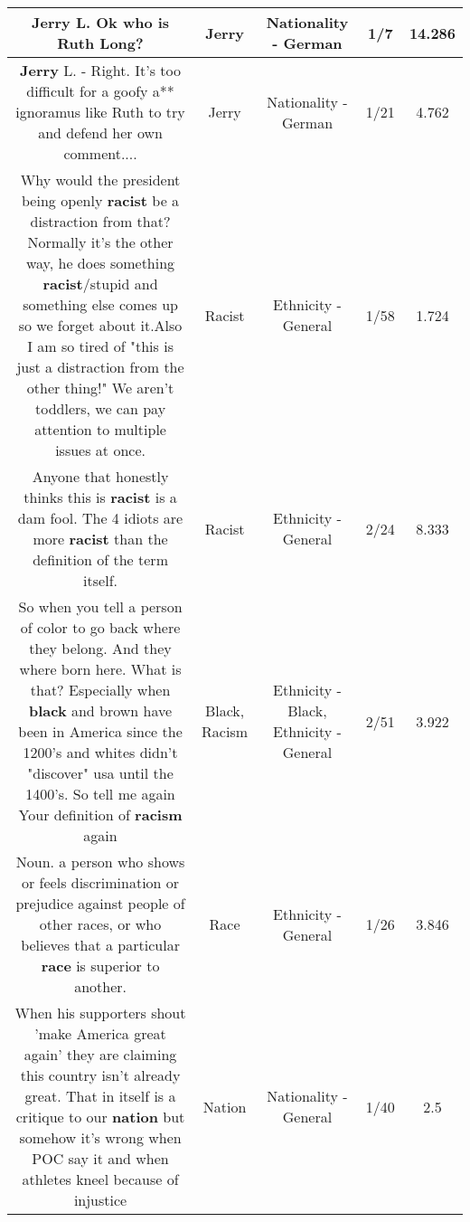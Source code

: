 \documentclass[11pt]{article}
\newlength\mylength
\begin{document}
\begin{center}
\begin{longtable}{|C{.65\mylength}|C{.30\mylength}|C{.12\mylength}|C{.12\mylength}|C{.12\mylength}|}
  \small \@\textbf{Jerry} L. Ok who is Ruth Long?\normalsize   & Jerry & Nationality - German & 1/7 & 14.286 \\  \hline
  \small \@\textbf{Jerry} L. - Right. It's too difficult for a goofy a** ignoramus like Ruth to try and defend her own comment....\normalsize   & Jerry & Nationality - German & 1/21 & 4.762 \\  \hline
  \small Why would the president being openly \textbf{racist} be a distraction from that? Normally it's the other way, he does something \textbf{racist}/stupid and something else comes up so we forget about it.Also I am so tired of "this is just a distraction from the other thing!" We aren't toddlers, we can pay attention to multiple issues at once.\normalsize   & Racist & Ethnicity - General & 1/58 & 1.724 \\  \hline
  \small Anyone that honestly thinks this is \textbf{racist} is a dam fool. The 4 idiots are more \textbf{racist} than the definition of the term itself.\normalsize   & Racist & Ethnicity - General & 2/24 & 8.333 \\  \hline
  \small So when you tell a person of color to go back where they belong. And they where born here. What is that? Especially when \textbf{black} and brown have been in America since the 1200's and whites  didn't "discover" usa until the 1400's. So tell me again Your definition of \textbf{racism} again\normalsize   & Black, Racism & Ethnicity - Black, Ethnicity - General & 2/51 & 3.922 \\  \hline
  \small Noun. a person who shows or feels discrimination or prejudice against people of other races, or who believes that a particular \textbf{race} is superior to another.\normalsize   & Race & Ethnicity - General & 1/26 & 3.846 \\  \hline
  \small When his supporters shout 'make America great again' they are claiming this country isn't already great. That in itself is a critique to our \textbf{nation} but somehow it's wrong when POC say it and when athletes kneel because of injustice\normalsize   & Nation & Nationality - General & 1/40 & 2.5 \\  \hline

\end{longtable}
\end{center}
\end{document}
